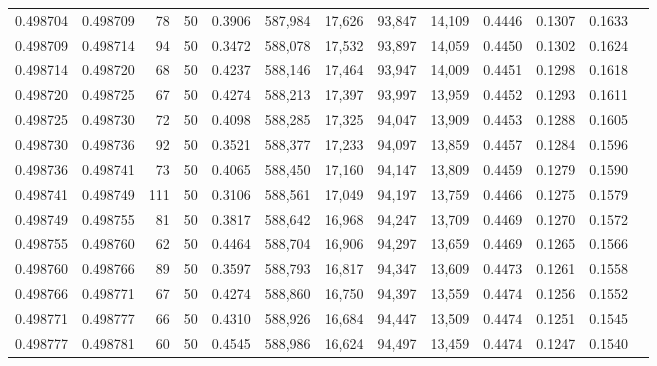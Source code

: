 \begin{tabular}{rrrrrrrrrrrrr}
0.498704 & 0.498709 &    78 &  50 &                                     0.3906 & 587,984 &  17,626 &  93,847 &  14,109 & 0.4446 & 0.1307 & 0.1633 \\
0.498709 & 0.498714 &    94 &  50 &                                     0.3472 & 588,078 &  17,532 &  93,897 &  14,059 & 0.4450 & 0.1302 & 0.1624 \\
0.498714 & 0.498720 &    68 &  50 &                                     0.4237 & 588,146 &  17,464 &  93,947 &  14,009 & 0.4451 & 0.1298 & 0.1618 \\
0.498720 & 0.498725 &    67 &  50 &                                     0.4274 & 588,213 &  17,397 &  93,997 &  13,959 & 0.4452 & 0.1293 & 0.1611 \\
0.498725 & 0.498730 &    72 &  50 &                                     0.4098 & 588,285 &  17,325 &  94,047 &  13,909 & 0.4453 & 0.1288 & 0.1605 \\
0.498730 & 0.498736 &    92 &  50 &                                     0.3521 & 588,377 &  17,233 &  94,097 &  13,859 & 0.4457 & 0.1284 & 0.1596 \\
0.498736 & 0.498741 &    73 &  50 &                                     0.4065 & 588,450 &  17,160 &  94,147 &  13,809 & 0.4459 & 0.1279 & 0.1590 \\
0.498741 & 0.498749 &   111 &  50 &                                     0.3106 & 588,561 &  17,049 &  94,197 &  13,759 & 0.4466 & 0.1275 & 0.1579 \\
0.498749 & 0.498755 &    81 &  50 &                                     0.3817 & 588,642 &  16,968 &  94,247 &  13,709 & 0.4469 & 0.1270 & 0.1572 \\
0.498755 & 0.498760 &    62 &  50 &                                     0.4464 & 588,704 &  16,906 &  94,297 &  13,659 & 0.4469 & 0.1265 & 0.1566 \\
0.498760 & 0.498766 &    89 &  50 &                                     0.3597 & 588,793 &  16,817 &  94,347 &  13,609 & 0.4473 & 0.1261 & 0.1558 \\
0.498766 & 0.498771 &    67 &  50 &                                     0.4274 & 588,860 &  16,750 &  94,397 &  13,559 & 0.4474 & 0.1256 & 0.1552 \\
0.498771 & 0.498777 &    66 &  50 &                                     0.4310 & 588,926 &  16,684 &  94,447 &  13,509 & 0.4474 & 0.1251 & 0.1545 \\
0.498777 & 0.498781 &    60 &  50 &                                     0.4545 & 588,986 &  16,624 &  94,497 &  13,459 & 0.4474 & 0.1247 & 0.1540 \\

\end{tabular}
